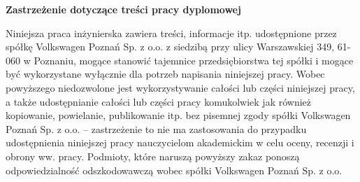 \begin{center}
    \Large \textbf{Zastrzeżenie dotyczące treści pracy dyplomowej}
\end{center}

\vspace{1cm}


Niniejsza praca inżynierska zawiera treści, informacje itp. udostępnione przez spółkę Volkswagen Poznań Sp.
z o.o.
z siedzibą przy ulicy Warszawskiej 349, 61-060 w Poznaniu, mogące stanowić
tajemnice przedsiębiorstwa tej spółki i mogące być wykorzystane wyłącznie dla
potrzeb napisania niniejszej pracy. Wobec powyższego niedozwolone jest
wykorzystywanie całości lub części niniejszej pracy, a także udostępnianie całości
lub części pracy komukolwiek jak również kopiowanie, powielanie, publikowanie itp.
bez pisemnej zgody spółki Volkswagen Poznań Sp. z o.o. – zastrzeżenie to nie ma
zastosowania do przypadku udostępnienia niniejszej pracy nauczycielom
akademickim w celu oceny, recenzji
i obrony ww. pracy. Podmioty, które naruszą powyższy zakaz ponoszą
odpowiedzialność odszkodowawczą wobec spółki Volkswagen Poznań Sp. z o.o.
